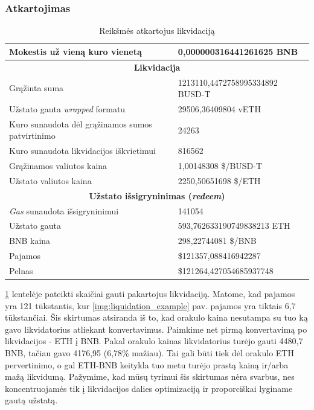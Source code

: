 \documentclass{VUMIFPSkursinis}
\begin{document}
\subsubsection{Atkartojimas}

\begin{table}[h!]
  \centering
  \begin{tabular}{|l|l|}
    \hline
    Mokestis už vieną kuro vienetą                           & 0,000000316441261625 BNB        \\
  \hline
  \multicolumn{2}{|c|}{\textbf{Likvidacija}}                              \\ \hline
  Grąžinta suma                            & 1213110,4472758995334892 BUSD-T         \\ \hline
  Užstato gauta \textit{wrapped} formatu             & 29506,36409804 vETH                     \\ \hline
  Kuro sunaudota dėl grąžinamos sumos patvirtinimo            & 24263                              \\ \hline
  Kuro sunaudota likvidacijos iškvietimui              & 816562                             \\ \hline
  Grąžinamos valiutos kaina               & 1,00148308 \$/BUSD-T               \\ \hline
  Užstato valiutos kaina          & 2250,50651698 \$/ETH            \\ \hline
  \multicolumn{2}{|c|}{\textbf{Užstato išsigryninimas (\textit{redeem})}}                                         \\ \hline
  \textit{Gas} sunaudota išsigryninimui                   & 141054                             \\ \hline
  Užstato gauta           & 593,762633190749838213 ETH             \\ \hline
  BNB kaina                & 298,22744081 \$/BNB             \\ \hline
  Pajamos                & \$121357,088416942287              \\ \hline
  Pelnas                 & \$121264,427054685937748              \\ \hline
  \end{tabular}
  \caption{Reikšmės atkartojus likvidaciją}
  \label{liquidation_example_repeat}
  \end{table}

\ref{liquidation_example_repeat} lentelėje pateikti skaičiai gauti pakartojus likvidaciją. Matome, kad pajamos yra 121 tūkstantis, kur \ref{img:liquidation_example} pav. pajamos yra tiktais 6,7 tūkstančiai. Šis skirtumas atsiranda iš to, kad orakulo kaina nesutampa su tuo ką gavo likvidatorius atliekant konvertavimus. Paimkime net pirmą konvertavimą po likvidacijos - ETH į BNB. Pakal orakulo kainas likvidatorius turėjo gauti 4480,7 BNB, tačiau gavo 4176,95 (6,78\% mažiau). Tai gali būti tiek dėl orakulo ETH pervertinimo, o gal ETH-BNB keitykla tuo metu turėjo prastą kainą ir/arba mažą likvidumą. Pažymime, kad mūsų tyrimui šis skirtumas nėra svarbus, nes koncentruojamės tik į likvidacijos dalies optimizaciją ir proporciškai lyginame gautą užstatą.
\end{document}
